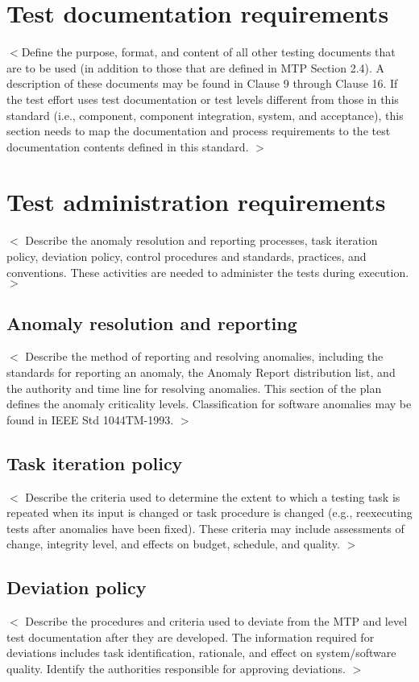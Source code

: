 \documentclass{scrreprt}
\begin{document}
\section{Test documentation requirements}
$<$Define the purpose, format, and content of all other testing documents that are to be used (in addition to those that are defined in MTP Section 2.4). A description of these documents may be found in Clause 9 through Clause 16. If the test effort uses test documentation or test levels different from those in this standard (i.e., component, component integration, system, and acceptance), this section needs to map the documentation and process requirements to the test documentation contents defined in this standard. $>$

\section{Test administration requirements}
$<$ Describe the anomaly resolution and reporting processes, task iteration policy, deviation policy, control procedures and standards, practices, and conventions. These activities are needed to administer the tests during execution. $>$

\subsection{Anomaly resolution and reporting}
$<$ Describe the method of reporting and resolving anomalies, including the standards for reporting an anomaly, the Anomaly Report distribution list, and the authority and time line for resolving anomalies. This section of the plan defines the anomaly criticality levels. Classification for software anomalies may be found in IEEE Std 1044TM-1993. $>$

\subsection{Task iteration policy}
$<$ Describe the criteria used to determine the extent to which a testing task is repeated when its input is changed or task procedure is changed (e.g., reexecuting tests after anomalies have been fixed). These criteria may include assessments of change, integrity level, and effects on budget, schedule, and quality. $>$

\subsection{Deviation policy}
$<$ Describe the procedures and criteria used to deviate from the MTP and level test documentation after they are developed. The information required for deviations includes task identification, rationale, and effect on system/software quality. Identify the authorities responsible for approving deviations. $>$
\end{document}
